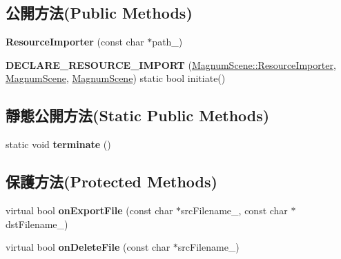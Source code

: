 \subsection*{公開方法(Public Methods)}
\begin{DoxyCompactItemize}
\item 
{\bfseries Resource\+Importer} (const char $\ast$path\+\_\+)\hypertarget{class_magnum_1_1_magnum_scene_1_1_resource_importer_a97287f84a6791bb2ea791baed4707d73}{}\label{class_magnum_1_1_magnum_scene_1_1_resource_importer_a97287f84a6791bb2ea791baed4707d73}

\item 
{\bfseries D\+E\+C\+L\+A\+R\+E\+\_\+\+R\+E\+S\+O\+U\+R\+C\+E\+\_\+\+I\+M\+P\+O\+RT} (\hyperlink{class_magnum_1_1_magnum_scene_1_1_resource_importer}{Magnum\+Scene\+::\+Resource\+Importer}, \hyperlink{class_magnum_1_1_magnum_scene}{Magnum\+Scene}, \hyperlink{class_magnum_1_1_magnum_scene}{Magnum\+Scene}) static bool initiate()\hypertarget{class_magnum_1_1_magnum_scene_1_1_resource_importer_aafa9dd3445789669ba5ab1b4a8839177}{}\label{class_magnum_1_1_magnum_scene_1_1_resource_importer_aafa9dd3445789669ba5ab1b4a8839177}

\end{DoxyCompactItemize}
\subsection*{靜態公開方法(Static Public Methods)}
\begin{DoxyCompactItemize}
\item 
static void {\bfseries terminate} ()\hypertarget{class_magnum_1_1_magnum_scene_1_1_resource_importer_a2d7670d7d2d5cafa85f8c266c5f7885f}{}\label{class_magnum_1_1_magnum_scene_1_1_resource_importer_a2d7670d7d2d5cafa85f8c266c5f7885f}

\end{DoxyCompactItemize}
\subsection*{保護方法(Protected Methods)}
\begin{DoxyCompactItemize}
\item 
virtual bool {\bfseries on\+Export\+File} (const char $\ast$src\+Filename\+\_\+, const char $\ast$dst\+Filename\+\_\+)\hypertarget{class_magnum_1_1_magnum_scene_1_1_resource_importer_a3e28f2a517dbc26d2dbb141b4390ca88}{}\label{class_magnum_1_1_magnum_scene_1_1_resource_importer_a3e28f2a517dbc26d2dbb141b4390ca88}

\item 
virtual bool {\bfseries on\+Delete\+File} (const char $\ast$src\+Filename\+\_\+)\hypertarget{class_magnum_1_1_magnum_scene_1_1_resource_importer_a6375fcd00b8d81101667dfcd68f44874}{}\label{class_magnum_1_1_magnum_scene_1_1_resource_importer_a6375fcd00b8d81101667dfcd68f44874}

\end{DoxyCompactItemize}
